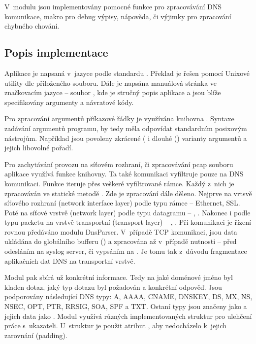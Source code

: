 \documentclass[11pt, a4paper, titlepage]{article}
\begin{document}
V~modulu  jsou implementovány pomocné funkce pro zpracovávání DNS komunikace, makro pro debug výpisy, nápověda, či výjimky pro zpracování chybného chování.
\bigskip



\subsection{Popis implementace}

Aplikace je napsaná v~jazyce  podle standardu . Překlad je řešen pomocí Unixové utility  dle přiloženého  souboru. Dále je napsána manuálová stránka ve značkovacím jazyce  -- soubor , kde je stručný popis aplikace a jsou blíže specifikovány argumenty a návratové kódy.
\bigskip

Pro zpracování argumentů příkazové řádky je využívána knihovna . Syntaxe zadávání argumentů programu, by tedy měla odpovídat standardním posixovým nástrojům. Například jsou povoleny zkrácené ( i dlouhé () varianty argumentů a jejich libovolné pořadí.
\bigskip

Pro zachytávání provozu na síťovém rozhraní, či zpracovávání pcap souboru aplikace využívá funkce  knihovny. Ta také komunikaci vyfiltruje pouze na DNS komunikaci. Funkce  iteruje přes veškeré vyfiltrované rámce. Každý z~nich je zpracováván ve statické metodě . Zde je zpracování dále děleno. Nejprve na vrtsvě síťového rozhraní (network interface layer) podle typu rámce -- Ethernet, SSL. Poté na síťové vrstvě (network layer) podle typu datagramu -- , . Nakonec i podle typu packetu na vrstvě transportní (transport layer) -- , . Při  komunikaci je řízení rovnou předáváno modulu DnsParser. V~případě TCP komunikaci, jsou data ukládána do globálního bufferu () a zpracována až v~případě nutnosti -- před odesláním na syslog server, či vypsáním na . Je tomu tak z~důvodu fragmentace aplikačních dat DNS na transportní vrstvě.
\bigskip

Modul  pak sbírá už konkrétní informace. Tedy na jaké doménové jméno byl kladen dotaz, jaký typ dotazu byl požadován a konkrétní odpověď. Jsou podporovány následující DNS typy: A, AAAA, CNAME, DNSKEY, DS, MX, NS, NSEC, OPT, PTR, RRSIG, SOA, SPF a TXT. Ostaní typy jsou značeny jako  a jejich data jako . Modul využívá různých implementovaných struktur pro ulehčení práce s~ukazateli. U~struktur je použit atribut , aby nedocházelo k~jejich zarovnání (padding).
\bigskip
\end{document}
